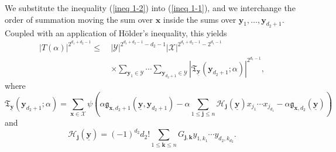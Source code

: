 \documentclass[12pt, reqno]{amsart}
\numberwithin{equation}{section}
\newcommand{\0}{\mathbf{0}}
\renewcommand{\leq}{\leqslant}
\newcommand{\x}{\mathbf{x}}
\newcommand{\y}{\mathbf{y}}
\renewcommand{\=}{\equiv}
\newcommand{\1}{\mathbf{1}}
\theoremstyle{definition}
\begin{document}
We substitute the inequality (\ref{ineq 1-2}) into (\ref{ineq 1-1}), and we interchange the order of summation moving
the sum over $\mathbf{x}$ inside the sums over $\mathbf{y}_1, \ldots, \y_{d_2 + 1}$.
Coupled with an application of H\"{o}lder's inequality, this yields
\begin{equation}
\label{Hod1}
\begin{split}
|T(\alpha)|^{2^{d_1+ d_2 - 1}}
\leq~&
|\mathcal{Y}|^{2^{d_1 + d_2 - 1} - d_2 - 1} |\mathcal{X}|^{  2^{d_1 + d_2 - 1} - 2^{d_1 - 1}  }\\
&\times
\sum_{\mathbf{y}_1 \in \mathcal{Y}} \cdots  \sum_{\mathbf{y}_{d_2 + 1} \in \mathcal{Y}  } | \mathfrak{T}_{ \underline{ \y } } (\y_{d_2 + 1} ;  \alpha) |^{2^{d_1 - 1} },
\end{split}\end{equation}
where 
$$
\mathfrak{T}_{\underline{\y}} ( \y_{d_2 + 1}; \alpha)
= 
\sum_{ \x \in \mathcal{X}}
\psi \left(
  \alpha \mathfrak{g}_{\x, d_2 + 1} (  \underline{\mathbf{y}},   \mathbf{y}_{d_2 + 1})
- \alpha \sum_{ 1 \leq  \mathbf{j} \leq n}   \mathcal{H}_{\mathbf{j}}(\underline{\mathbf{y}}) x_{j_1} \cdots x_{j_{d_1}}
  - \alpha  \mathfrak{g}_{\mathbf{x}, d_2} (\underline{\mathbf{y}})
\right)
$$
and
$$
\mathcal{H}_{\mathbf{j}}(\underline{\mathbf{y}}) =
(-1)^{d_2} d_2!
\sum_{ 1 \leq  \mathbf{k} \leq n }  G_{\mathbf{j}, \mathbf{k} }  y_{1, k_1} \cdots y_{{d_2}, k_{d_2}}.
$$
\end{document}
